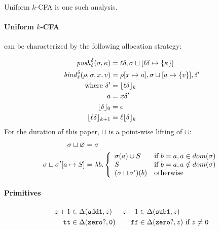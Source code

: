 \documentclass[preprint,onecolumn,9pt]{sigplanconf} %
\begin{document}
Uniform \(k\)-CFA is one such analysis.

\paragraph{Uniform \(k\)-CFA} can be characterized by the following allocation
strategy:

\begin{align*}
\mathit{push}_{\ell}^{\delta}(\sigma,\kappa) &=
  {\ell}{\delta},\sigma\sqcup[{\ell}{\delta}\mapsto\{\kappa\}] \\
\mathit{bind}^{\delta}_{\ell}(\rho,\sigma,x,v) &= \rho[x \mapsto a],
                                           \sigma\sqcup[a \mapsto
                                             \{ v\}],
                                           {\delta}' \\
\mbox{where } {\delta}' &= \lfloor{\ell}{\delta}\rfloor_k \\
              a &= x{\delta}' \\
              \lfloor {\delta} \rfloor_0 &= {\epsilon} \\
              \lfloor {\ell}{\delta} \rfloor_{k+1} &= {\ell}\lfloor {\delta}\rfloor_k
\end{align*}
For the duration of this paper, $\sqcup$ is a point-wise lifting of $\cup$:
\begin{align*}
\sigma\sqcup \varnothing &= \sigma \\
\sigma\sqcup \sigma'[a \mapsto S] &= \lambda b. \left\{
  \begin{array}{ll}
    \sigma(a)\cup S & \mbox{if } b = a, a\in dom(\sigma) \\
    S & \mbox{if } b = a, a\notin dom(\sigma) \\
    (\sigma\sqcup\sigma')(b) & \mbox{otherwise}
  \end{array}\right.
\end{align*}

\paragraph{Primitives}

\begin{align*}
z+1 &\in \Delta({\tt add1},z) &
z-1 &\in \Delta({\tt sub1},z)\\
{\tt tt} &\in \Delta({\tt zero?},{\tt 0}) &
{\tt ff} &\in \Delta({\tt zero?},z)\text{ if }z\neq {\tt 0}\\
\end{align*}
\end{document}
